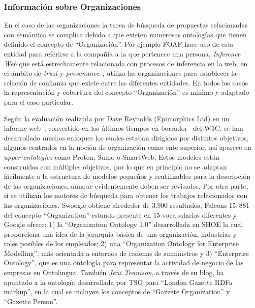 \subsubsection{Información sobre Organizaciones}\label{sect:orgs}
En el caso de las organizaciones la tarea de búsqueda de propuestas relacionadas
con semántica se complica debido a que existen numerosas ontologías que tienen
definido el concepto de ``Organización''. Por ejemplo \gls{FOAF} hace uso de esta entidad
para referirse a la compañía a la que pertenece una persona, \textit{Inference Web} que 
está estrechamente relacionada con procesos de inferencia en la web, en el ámbito de \textit{trust} y \textit{provenance}~\cite{prov-group}, 
utiliza las organizaciones para establecer la relación de confianza que existe entre las diferentes entidades. En todos los casos
la representación y cobertura del concepto ``Organización'' es mínimo y adaptado
para el caso particular.

Según la evaluación realizada por Dave Reynolds (Epimorphics Ltd) en un informe web~\cite{org-ontology}, convertido 
en los últimos tiempos en borrador~\cite{dave-w3c} del \gls{W3C}, se han desarrollado muchos enfoques los cuales estaban dirigidos por distintos objetivos, algunos centrados 
en la noción de organización como ente superior, así aparece en \textit{upper-ontologies} como Proton, Sumo o SmartWeb. Estos modelos están construidos con múltiples objetivos, 
por lo que en principio no se adaptan fácilmente a la estructura de modelos pequeños y reutilizables 
para la descripción de las organizaciones, aunque evidentemente deben ser revisados. Por otra parte,
si se utilizan los motores de búsqueda para obtener los trabajos relacionados con las organizaciones, Swoogle obtiene 
alrededor de $3.900$ resultados, Falcons $15,881$ del concepto ``Organization''
estando presente en 15 vocabularios diferentes y Google ofrece: 1) la ``Organization Ontology 1.0'' desarrollada
en SHOE la cual proporciona una idea de la jerarquía básica de una organización, industrias y roles posibles de los empleados;
2) una ``Organization Ontology for Enterprise Modelling'', más orientada a entornos de cadenas
de suministros y 3) ``Enterprise Ontology'', que es una ontología para representar la actividad de negocio
de las empresas en Ontolingua. También \textit{Jeni Tennison}, a través de su blog, ha apuntado a la ontología
desarrollada por TSO para ``London Gazette \gls{RDFa} markup'', en la cual se incluyen los conceptos de ``Gazzete Organization''
y ``Gazette Person''. 

